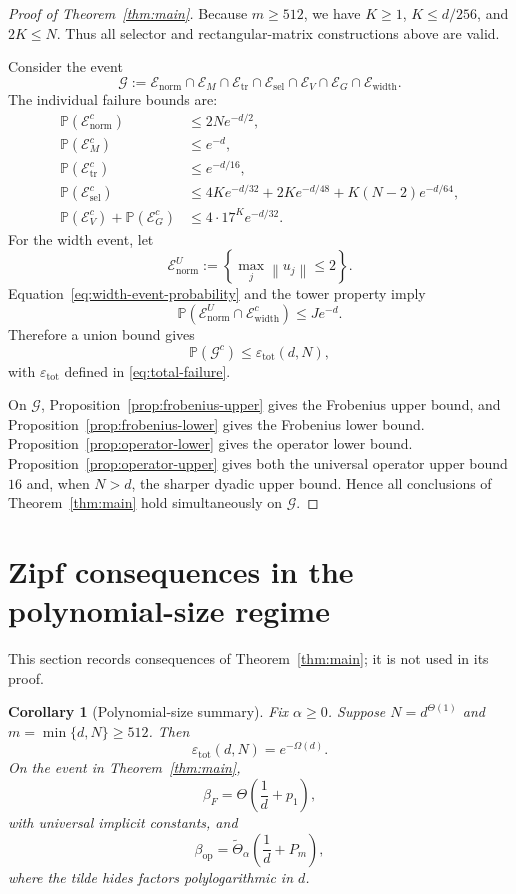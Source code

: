\documentclass[11pt]{article}
\newtheorem{corollary}[theorem]{Corollary}
\newcommand{\Pp}{\mathbb{P}}
\newcommand{\1}{\mathbf{1}}
\newcommand{\op}{\mathrm{op}}
\newcommand{\norm}[1]{\left\|#1\right\|}
\begin{document}
\begin{proof}[Proof of Theorem~\ref{thm:main}]
Because \(m\ge512\), we have \(K\ge1\), \(K\le d/256\), and \(2K\le N\).
Thus all selector and rectangular-matrix constructions above are valid.

Consider the event
\[
 \mathcal G
 :=
 \mathcal E_{\mathrm{norm}}
 \cap\mathcal E_M
 \cap\mathcal E_{\mathrm{tr}}
 \cap\mathcal E_{\mathrm{sel}}
 \cap\mathcal E_V
 \cap\mathcal E_G
 \cap\mathcal E_{\mathrm{width}}.
\]
The individual failure bounds are:
\begin{align*}
 \Pp(\mathcal E_{\mathrm{norm}}^c)
 &\le2Ne^{-d/2},\\
 \Pp(\mathcal E_M^c)
 &\le e^{-d},\\
 \Pp(\mathcal E_{\mathrm{tr}}^c)
 &\le e^{-d/16},\\
 \Pp(\mathcal E_{\mathrm{sel}}^c)
 &\le
 4K e^{-d/32}
 +2K e^{-d/48}
 +K(N-2)e^{-d/64},\\
 \Pp(\mathcal E_V^c)+\Pp(\mathcal E_G^c)
 &\le4\cdot17^K e^{-d/32}.
\end{align*}
For the width event, let
\[
 \mathcal E_{\mathrm{norm}}^U
 :=
 \left\{\max_j\norm{u_j}\le2\right\}.
\]
Equation~\eqref{eq:width-event-probability} and the tower property imply
\[
 \Pp\left(
 \mathcal E_{\mathrm{norm}}^U
 \cap\mathcal E_{\mathrm{width}}^c
 \right)
 \le J e^{-d}.
\]
Therefore a union bound gives
\[
 \Pp(\mathcal G^c)
 \le
 \varepsilon_{\mathrm{tot}}(d,N),
\]
with \(\varepsilon_{\mathrm{tot}}\) defined in
\eqref{eq:total-failure}.

On \(\mathcal G\), Proposition~\ref{prop:frobenius-upper} gives the
Frobenius upper bound, and Proposition~\ref{prop:frobenius-lower} gives the
Frobenius lower bound.  Proposition~\ref{prop:operator-lower} gives the
operator lower bound.  Proposition~\ref{prop:operator-upper} gives both the
universal operator upper bound \(16\) and, when \(N>d\), the sharper dyadic
upper bound.  Hence all conclusions of Theorem~\ref{thm:main} hold
simultaneously on \(\mathcal G\).
\end{proof}

\section{Zipf consequences in the polynomial-size regime}
\label{sec:consequences}

This section records consequences of Theorem~\ref{thm:main}; it is not used in
its proof.

\begin{corollary}[Polynomial-size summary]
\label{cor:polynomial-size}
Fix \(\alpha\ge0\).  Suppose \(N=d^{\Theta(1)}\) and
\(m=\min\{d,N\}\ge512\).  Then
\[
 \varepsilon_{\mathrm{tot}}(d,N)=e^{-\Omega(d)}.
\]
On the event in Theorem~\ref{thm:main},
\[
 \beta_F
 =\Theta\left(\frac1d+p_1\right),
\]
with universal implicit constants, and
\[
 \beta_{\op}
 =\widetilde\Theta_\alpha\left(\frac1d+P_m\right),
\]
where the tilde hides factors polylogarithmic in \(d\).
\end{corollary}
\end{document}
